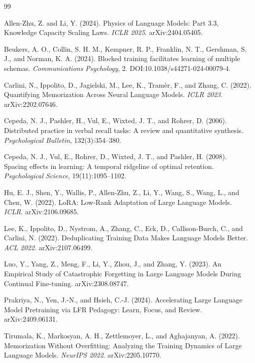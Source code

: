 \documentclass[10pt]{article}
\begin{document}
\begin{thebibliography}{99}

Allen-Zhu, Z. and Li, Y. (2024).
\newblock Physics of Language Models: Part 3.3, Knowledge Capacity Scaling Laws.
\newblock \emph{ICLR 2025}. arXiv:2404.05405.

Beukers, A. O., Collin, S. H. M., Kempner, R. P., Franklin, N. T., Gershman, S. J., and Norman, K. A. (2024).
\newblock Blocked training facilitates learning of multiple schemas.
\newblock \emph{Communications Psychology}, 2. DOI:10.1038/s44271-024-00079-4.

Carlini, N., Ippolito, D., Jagielski, M., Lee, K., Tram\`er, F., and Zhang, C. (2022).
\newblock Quantifying Memorization Across Neural Language Models.
\newblock \emph{ICLR 2023}. arXiv:2202.07646.

Cepeda, N. J., Pashler, H., Vul, E., Wixted, J. T., and Rohrer, D. (2006).
\newblock Distributed practice in verbal recall tasks: A review and quantitative synthesis.
\newblock \emph{Psychological Bulletin}, 132(3):354--380.

Cepeda, N. J., Vul, E., Rohrer, D., Wixted, J. T., and Pashler, H. (2008).
\newblock Spacing effects in learning: A temporal ridgeline of optimal retention.
\newblock \emph{Psychological Science}, 19(11):1095--1102.

Hu, E. J., Shen, Y., Wallis, P., Allen-Zhu, Z., Li, Y., Wang, S., Wang, L., and Chen, W. (2022).
\newblock LoRA: Low-Rank Adaptation of Large Language Models.
\newblock \emph{ICLR}. arXiv:2106.09685.

Lee, K., Ippolito, D., Nystrom, A., Zhang, C., Eck, D., Callison-Burch, C., and Carlini, N. (2022).
\newblock Deduplicating Training Data Makes Language Models Better.
\newblock \emph{ACL 2022}. arXiv:2107.06499.

Luo, Y., Yang, Z., Meng, F., Li, Y., Zhou, J., and Zhang, Y. (2023).
\newblock An Empirical Study of Catastrophic Forgetting in Large Language Models During Continual Fine-tuning.
\newblock arXiv:2308.08747.

Prakriya, N., Yen, J.-N., and Hsieh, C.-J. (2024).
\newblock Accelerating Large Language Model Pretraining via LFR Pedagogy: Learn, Focus, and Review.
\newblock arXiv:2409.06131.

Tirumala, K., Markosyan, A. H., Zettlemoyer, L., and Aghajanyan, A. (2022).
\newblock Memorization Without Overfitting: Analyzing the Training Dynamics of Large Language Models.
\newblock \emph{NeurIPS 2022}. arXiv:2205.10770.

\end{thebibliography}
\end{document}
